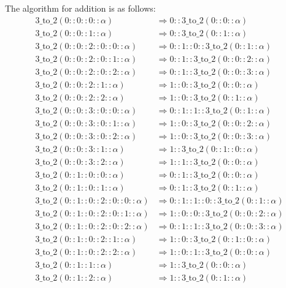 \documentclass{cs4rep}
\begin{document}
The algorithm for addition is as follows:
\[ \begin{array}{ll}
\mbox{3\_to\_2}(0::0::0::\alpha) & \Rightarrow 0::\mbox{3\_to\_2}(0::0::\alpha) \\
\mbox{3\_to\_2}(0::0::1::\alpha) & \Rightarrow 0::\mbox{3\_to\_2}(0::1::\alpha) \\
\mbox{3\_to\_2}(0::0::2::0::0::\alpha) & \Rightarrow 0::1::0::\mbox{3\_to\_2}(0::1::\alpha) \\
\mbox{3\_to\_2}(0::0::2::0::1::\alpha) & \Rightarrow 0::1::\mbox{3\_to\_2}(0::0::2::\alpha) \\
\mbox{3\_to\_2}(0::0::2::0::2::\alpha) & \Rightarrow 0::1::\mbox{3\_to\_2}(0::0::3::\alpha) \\
\mbox{3\_to\_2}(0::0::2::1::\alpha) & \Rightarrow 1::0::\mbox{3\_to\_2}(0::0::\alpha) \\
\mbox{3\_to\_2}(0::0::2::2::\alpha) & \Rightarrow 1::0::\mbox{3\_to\_2}(0::1::\alpha) \\
\mbox{3\_to\_2}(0::0::3::0::0::\alpha) & \Rightarrow 0::1::1::\mbox{3\_to\_2}(0::1::\alpha) \\
\mbox{3\_to\_2}(0::0::3::0::1::\alpha) & \Rightarrow 1::0::\mbox{3\_to\_2}(0::0::2::\alpha) \\
\mbox{3\_to\_2}(0::0::3::0::2::\alpha) & \Rightarrow 1::0::\mbox{3\_to\_2}(0::0::3::\alpha) \\
\mbox{3\_to\_2}(0::0::3::1::\alpha) & \Rightarrow 1::\mbox{3\_to\_2}(0::1::0::\alpha) \\
\mbox{3\_to\_2}(0::0::3::2::\alpha) & \Rightarrow 1::1::\mbox{3\_to\_2}(0::0::\alpha) \\
\mbox{3\_to\_2}(0::1::0::0::\alpha) & \Rightarrow 0::1::\mbox{3\_to\_2}(0::0::\alpha) \\
\mbox{3\_to\_2}(0::1::0::1::\alpha) & \Rightarrow 0::1::\mbox{3\_to\_2}(0::1::\alpha) \\
\mbox{3\_to\_2}(0::1::0::2::0::0::\alpha) & \Rightarrow 0::1::1::0::\mbox{3\_to\_2}(0::1::\alpha) \\
\mbox{3\_to\_2}(0::1::0::2::0::1::\alpha) & \Rightarrow 1::0::0::\mbox{3\_to\_2}(0::0::2::\alpha) \\
\mbox{3\_to\_2}(0::1::0::2::0::2::\alpha) & \Rightarrow 0::1::1::\mbox{3\_to\_2}(0::0::3::\alpha) \\
\mbox{3\_to\_2}(0::1::0::2::1::\alpha) & \Rightarrow 1::0::\mbox{3\_to\_2}(0::1::0::\alpha) \\
\mbox{3\_to\_2}(0::1::0::2::2::\alpha) & \Rightarrow 1::0::1::\mbox{3\_to\_2}(0::0::\alpha) \\
\mbox{3\_to\_2}(0::1::1::\alpha) & \Rightarrow 1::\mbox{3\_to\_2}(0::0::\alpha) \\
\mbox{3\_to\_2}(0::1::2::\alpha) & \Rightarrow 1::\mbox{3\_to\_2}(0::1::\alpha)
\end{array} \]
\end{document}
